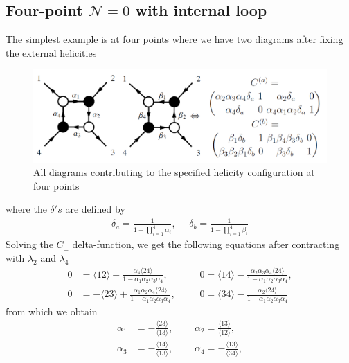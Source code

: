 \documentclass[letter,11pt]{article}
\begin{document}
\subsection{Four-point $\mathcal{N}=0$ with internal loop}
The simplest example is at four points where we have two diagrams after fixing the external helicities
\begin{figure}[H]
	\centering
	\includegraphics[width=0.7\linewidth]{YM4pt}
	\caption{All diagrams contributing to the specified helicity configuration at four points}
	\label{fig:jexample}
\end{figure}
where the $\delta's$ are defined by
\begin{equation}
	\begin{aligned}
		\delta_a=\frac{1}{1-\prod_{i=1}^{4}\alpha_i},~~~~~~\delta_b=\frac{1}{1-\prod_{i=1}^{4}\beta_i}
	\end{aligned}
\end{equation}
Solving the $C_\perp$ delta-function, we get the following equations after contracting with $\lambda_2$ and $\lambda_4$
\begin{equation}
	\begin{aligned} \label{eq:1}
		           0&=   
		\langle 1 2 \rangle + \frac{ \alpha_{4} \langle 2 4\rangle
		}{1 - \alpha_{1} \alpha_{2} \alpha_{3} \alpha_{4}},~~~~&&
 0=   
\langle 1 4\rangle - \frac{\alpha_{2} \alpha_{3} \alpha_{4} \langle 2 4\rangle
}{1 - \alpha_{1} \alpha_{2} \alpha_{3} \alpha_{4}},
\\
 0&=   
-\langle 23\rangle + \frac{\alpha_{1} \alpha_{2} \alpha_{4} \langle 2 4\rangle
}{1 - \alpha_{1} \alpha_{2} \alpha_{3} \alpha_{4}}
,~~~~&&
	 0=   
	\langle 3 4\rangle - \frac{\alpha_{2}  \langle 2 4\rangle
	}{1 - \alpha_{1} \alpha_{2} \alpha_{3} \alpha_{4}}
	\end{aligned}
\end{equation}
from which we obtain
\begin{equation}
	\begin{aligned} \label{eq:1}
	\alpha_1&=-\frac{\langle 23 \rangle}{\langle 13\rangle},~~~~~~~~~~\alpha_2=\frac{\langle 13 \rangle}{\langle 12\rangle},\\
	\alpha_3&=-\frac{\langle 14 \rangle}{\langle 13\rangle},~~~~~~~~~~	\alpha_4=-\frac{\langle 13 \rangle}{\langle 34\rangle},
	\end{aligned}
\end{equation}
\end{document}
